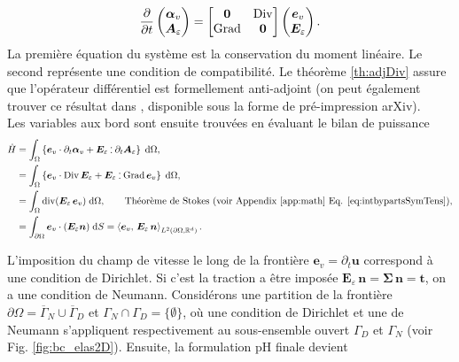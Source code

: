 \begin{equation*}
\diffp{}{t}
\begin{pmatrix}
\bm{\alpha}_v \\
\bm{A}_\varepsilon
\end{pmatrix} = 
\begin{bmatrix}
\bm{0} & \Div \\
\Grad & \bm{0} \\
\end{bmatrix}
\begin{pmatrix}
\bm{e}_v \\
\bm{E}_\varepsilon
\end{pmatrix}.
\end{equation*}
La première équation du système est la conservation du moment linéaire. Le second représente une condition de compatibilité. Le théorème \ref{th:adjDiv} assure que l'opérateur différentiel est formellement anti-adjoint (on peut également trouver ce résultat dans \cite[Lemme 3.3] {pauly2020elasticity}, disponible sous la forme de pré-impression arXiv). \\

Les variables aux bord sont ensuite trouvées en évaluant le bilan de puissance
\begin{equation*}
\begin{aligned}
\dot{H} &= \int_{\Omega} \left\{ \bm{e}_v \cdot \partial_t \bm\alpha_v + \bm{E}_\varepsilon \cddot \partial_t \bm{A}_\varepsilon \right\} \d\Omega, \\
&= \int_{\Omega} \left\{\bm{e}_v \cdot \Div \bm{E}_\varepsilon + \bm{E}_\varepsilon \cddot \Grad \bm{e}_v \right\}\d\Omega,\\
&= \int_{\Omega} \div(\bm{E}_\varepsilon \, \bm{e}_v) \d\Omega, \qquad \text{Théorème de Stokes (voir  Appendix \ref{app:math} Eq. \eqref{eq:intbypartsSymTens}}), \\
&= \int_{\partial \Omega} \bm{e}_v \cdot (\bm{E}_\varepsilon\bm{n}) \d{S} = \inner[L^2(\partial\Omega, \bbR^d)]{\bm{e}_v}{\bm{E}_\varepsilon \, \bm{n}}.
\end{aligned}
\end{equation*}

L'imposition du champ de vitesse le long de la frontière $ \bm{e}_v = \partial_t \bm{u} $ correspond à une condition de Dirichlet. Si c'est la traction a être imposée $ \bm{E}_\varepsilon \, \bm{n} = \bm{\Sigma} \, \bm{n} = \bm{t}$, on a une condition de Neumann. Considérons une partition de la frontière $\partial \Omega = \overline{\Gamma}_N \cup \overline{\Gamma}_D $ et $\Gamma_N \cap \Gamma_D = \{\emptyset\} $, où une condition de Dirichlet et une de Neumann s'appliquent respectivement au sous-ensemble ouvert $\Gamma_D $ et $\Gamma_N $ (voir Fig. \ref{fig:bc_elas2D}). Ensuite, la formulation pH finale devient

